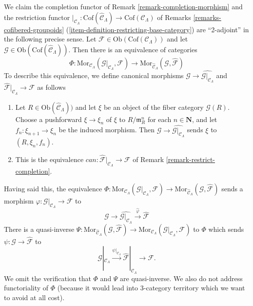 \begin{remark}
\label{remark-completion-restriction-adjoint}
We claim the completion functor of
Remark \ref{remark-completion-morphism}
and the restriction functor
$|_{\mathcal{C}_\Lambda} : \text{Cof}(\widehat{\mathcal{C}}_\Lambda)
\to \text{Cof}(\mathcal{C}_\Lambda)$ of
Remarks \ref{remarks-cofibered-groupoids}
(\ref{item-definition-restricting-base-category})
are ``2-adjoint'' in the following precise sense. Let
$\mathcal{F} \in \text{Ob}(\text{Cof}(\mathcal{C}_\Lambda))$
and let
$\mathcal{G} \in \text{Ob}(\text{Cof}(\widehat{\mathcal{C}}_\Lambda))$.
Then there is an equivalence of categories
$$
\Phi :
\text{Mor}_{\mathcal{C}_\Lambda}(
\mathcal{G}|_{\mathcal{C}_\Lambda}, \mathcal{F}) 
\longrightarrow
\text{Mor}_{\widehat{\mathcal{C}}_\Lambda}(\mathcal{G}, \widehat{\mathcal{F}})
$$
To describe this equivalence, we 
define canonical morphisms
$\mathcal{G} \to \widehat{\mathcal{G}|_{\mathcal{C}_\Lambda}}$ and
$\widehat{\mathcal{F}}|_{\mathcal{C}_\Lambda} \to \mathcal{F}$ as follows
\begin{enumerate}
\item Let $R \in \text{Ob}(\widehat{\mathcal{C}}_\Lambda))$ and let $\xi$
be an object of the fiber category $\mathcal{G}(R)$.
Choose a pushforward $\xi \to \xi_n$ of $\xi$ to
$R/\mathfrak m_R^n$ for each $n \in \mathbf{N}$, and let
$f_n : \xi_{n + 1} \to \xi_n$ be the induced morphism.
Then $\mathcal{G} \to \widehat{\mathcal{G}|_{\mathcal{C}_\Lambda}}$
sends $\xi$ to $(R, \xi_n, f_n)$.  
\item This is the equivalence
$can : \widehat{\mathcal{F}}|_{\mathcal{C}_\Lambda} \to \mathcal{F}$
of
Remark \ref{remark-restrict-completion}.
\end{enumerate}
Having said this, the equivalence
$\Phi : \text{Mor}_{\mathcal{C}_\Lambda}(
\mathcal{G}|_{\mathcal{C}_\Lambda}, \mathcal{F})  \to
\text{Mor}_{\widehat{\mathcal{C}}_\Lambda}(\mathcal{G},
\widehat{\mathcal{F}})$
sends a morphism
$\varphi : \mathcal{G}|_{\mathcal{C}_\Lambda} \to \mathcal{F}$
to
$$
\mathcal{G} \to \widehat{\mathcal{G}|_{\mathcal{C}_\Lambda}} 
\xrightarrow{\widehat{\varphi}} \widehat{\mathcal{F}}
$$
There is a quasi-inverse
$\Psi :
\text{Mor}_{\widehat{\mathcal{C}}_\Lambda}(
\mathcal{G}, \widehat{\mathcal{F}}) \to 
\text{Mor}_{\mathcal{C}_\Lambda}(
\mathcal{G}|_{\mathcal{C}_\Lambda}, \mathcal{F})$
to $\Phi$ which sends $\psi : \mathcal{G} \to \widehat{\mathcal{F}}$ to
$$
\mathcal{G}|_{\mathcal{C}_\Lambda} \xrightarrow{\psi|_{\mathcal{C}_\Lambda}}
\widehat{\mathcal{F}}|_{\mathcal{C}_\Lambda} \to \mathcal{F}.
$$
We omit the verification that $\Phi$ and $\Psi$ are quasi-inverse.
We also do not address functoriality of $\Phi$ (because it would
lead into 3-category territory which we want to avoid at all cost).
\end{remark}

